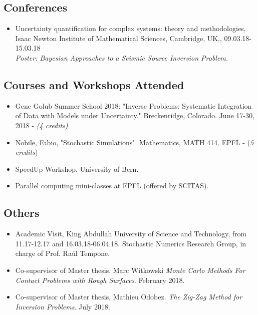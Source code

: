 


\subsection{Conferences}

\begin{itemize}
	\item Uncertainty quantification for complex systems: theory and methodologies, Isaac Newton Institute of Mathematical Sciences, Cambridge, UK., 09.03.18-15.03.18 \\ 
	\textit{Poster: Bayesian Approaches to a Seismic Source Inversion Problem.}

\end{itemize}

\subsection{Courses and Workshops Attended}

\begin{itemize}
	\item Gene Golub Summer School 2018: "Inverse Problems: Systematic Integration of Data with Models under
	Uncertainty." Breckenridge, Colorado. June 17-30, 2018 - \textit{(4 credits)}
	\item Nobile, Fabio, "Stochastic Simulations". Mathematics, MATH 414. EPFL - (\textit{5 credits})
	\item SpeedUp Workshop, University of Bern.
	\item Parallel computing mini-classes at EPFL (offered by SCITAS).
	
\end{itemize}

\subsection{Others}

\begin{itemize}
	\item Academic Visit, King Abdullah University of Science and Technology, from 11.17-12.17 and 16.03.18-06.04.18. Stochastic Numerics Research Group, in charge of Prof. Ra\'ul Tempone. 
	\item Co-supervisor of Master thesis, Marc  Witkowski \textit{Monte Carlo Methods For Contact Problems with Rough Surfaces}. February 2018.
	\item Co-supervisor of Master thesis, Mathieu Odobez. \textit{The Zig-Zag Method for Inversion Problems}. July 2018.

\end{itemize}
